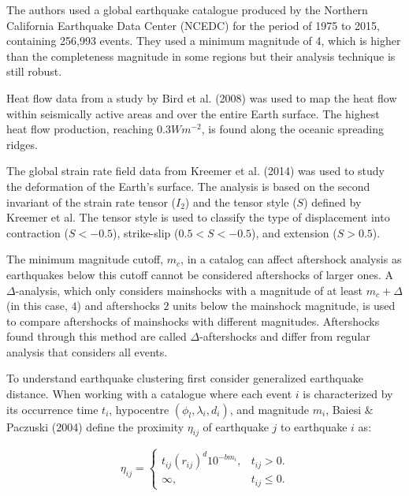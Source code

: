\documentclass[12pt]{article} %
\theoremstyle{plain}
\begin{document}
	The authors used a global earthquake catalogue produced by the Northern California Earthquake Data Center (NCEDC) for the period of 1975 to 2015, containing 256,993 events. They used a minimum magnitude of 4, which is higher than the completeness magnitude in some regions but their analysis technique is still robust. 
	
	Heat flow data from a study by Bird et al. (2008) was used to map the heat flow within seismically active areas and over the entire Earth surface. The highest heat flow production, reaching $0.3 W m^{-2}$, is found along the oceanic spreading ridges. 
	
	The global strain rate field data from Kreemer et al. (2014) was used to study the deformation of the Earth's surface. The analysis is based on the second invariant of the strain rate tensor ($I_2$) and the tensor style ($S$) defined by Kreemer et al. The tensor style is used to classify the type of displacement into contraction ($S < -0.5$), strike-slip ($0.5 < S < -0.5$), and extension ($S > 0.5$).

	
	The minimum magnitude cutoff, $m_c$, in a catalog can affect aftershock analysis as earthquakes below this cutoff cannot be considered aftershocks of larger ones. A $\Delta$-analysis, which only considers mainshocks with a magnitude of at least $m_c+\Delta$ (in this case, $4$) and aftershocks $2$ units below the mainshock magnitude, is used to compare aftershocks of mainshocks with different magnitudes. Aftershocks found through this method are called $\Delta$-aftershocks and differ from regular analysis that considers all events.
	
	To understand earthquake clustering first consider generalized earthquake distance. When working with a catalogue where each event $i$ is characterized by its occurrence time $t_i$, hypocentre $(\phi_l, \lambda_i, d_i)$, and magnitude $m_i$, Baiesi $\&$ Paczuski (2004) define the proximity $ \eta_{ij}$ of earthquake $j$ to earthquake $i$ as:
	
	\begin{equation} \label{eq:generalized_distance}
	\eta_{ij} = \begin{cases}
		t_{ij}(r_{ij})^d10^{-bm_i}, & t_{ij}>0.\\
		\infty , & t_{ij} \leq 0.
	\end{cases}
	\end{equation}
\end{document}
